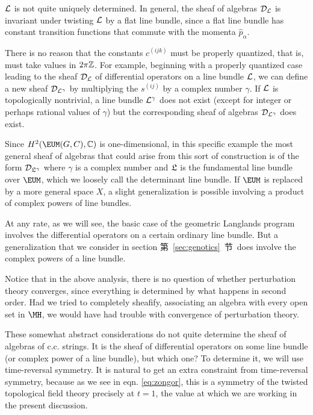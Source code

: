 ${\cal L}$ is not quite uniquely determined.  In general, the
sheaf of algebras ${\cal D}_{\cal L}$ is invariant under twisting
${\cal L}$ by a flat line bundle, since a flat line bundle has
constant transition functions that commute with the momenta $\hat
p_\alpha$.

There is no reason that the constants $c^{(ijk)}$ must be properly
quantized, that is, must take values in $2\pi\Bbb{Z}$.  For
example, beginning with a properly quantized case leading to the
sheaf ${\cal D}_{\cal L}$ of differential operators on a line
bundle ${\cal L}$, we can define a new sheaf ${\cal D}_{\cal
L^\gamma}$ by multiplying the $s^{(ij)}$ by a complex number
$\gamma$. If ${\cal L}$ is topologically nontrivial, a line bundle
${\cal L}^\gamma$ does not exist (except for integer or perhaps
rational values of $\gamma$) but the corresponding sheaf of
algebras ${\cal D}_{{\cal L}^\gamma}$ does exist.

Since $H^2({\EUM}(G,C),\Bbb{C})$ is one-dimensional, in this
specific example the most general sheaf of algebras that could
arise from this sort of construction is of the form ${\cal
D}_{{{\frak L}}^\gamma}$ where $\gamma$ is a complex number and
${{\frak L}}$ is the fundamental line bundle over $\EUM$, which we
loosely call the determinant line bundle. If ${\EUM}$ is replaced
by a more general space $X$, a slight generalization is possible
involving a product of complex powers of line bundles.

At any rate, as we will see, the basic case of the geometric
Langlands program involves the differential operators on a certain
ordinary line bundle.  But a generalization that we consider in
section 第~\ref{sec:genotics}~节\ does involve the complex powers of a line
bundle.

Notice that in the above analysis, there is no question of whether
perturbation theory converges, since everything is determined by
what happens in second order.  Had we tried to completely
sheafify, associating an algebra with every open set in $\MH$, we
would have had trouble with convergence of perturbation theory.

\par{}

These somewhat abstract considerations do not quite determine the
sheaf of algebras of c.c. strings. It is the sheaf of differential
operators on some line bundle (or complex power of a line bundle),
but which one? To determine it, we will use time-reversal
symmetry.  It is natural to get an extra constraint from
time-reversal symmetry, because as we see in eqn. \eqref{eq:zongor}, this is
a symmetry of the twisted topological field theory precisely at
$t=1$, the value at which we are working in the present
discussion.

